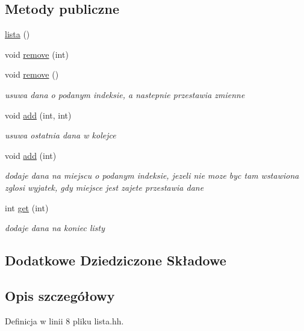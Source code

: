 \subsection*{Metody publiczne}
\begin{DoxyCompactItemize}
\item 
\hyperlink{classlista_a7ae1e1582d5b90e6bc26b8ecd2894072}{lista} ()
\item 
void \hyperlink{classlista_a567ac3ce85a3a7d7b10a3b0aafed56dd}{remove} (int)
\item 
void \hyperlink{classlista_af1900e0adeee6f2bf55c3b01c94b5e42}{remove} ()
\begin{DoxyCompactList}\small\item\em usuwa dana o podanym indeksie, a nastepnie przestawia zmienne \end{DoxyCompactList}\item 
void \hyperlink{classlista_abbc313e4d15605053e317b28246146bf}{add} (int, int)
\begin{DoxyCompactList}\small\item\em usuwa ostatnia dana w kolejce \end{DoxyCompactList}\item 
void \hyperlink{classlista_aa3b586da2830b20ca5818509a34ed6a6}{add} (int)
\begin{DoxyCompactList}\small\item\em dodaje dana na miejscu o podanym indeksie, jezeli nie moze byc tam wstawiona zglosi wyjatek, gdy miejsce jest zajete przestawia dane \end{DoxyCompactList}\item 
int \hyperlink{classlista_aca7a3313138e7033678c32b625fd5473}{get} (int)
\begin{DoxyCompactList}\small\item\em dodaje dana na koniec listy \end{DoxyCompactList}\end{DoxyCompactItemize}
\subsection*{Dodatkowe Dziedziczone Składowe}


\subsection{Opis szczegółowy}


Definicja w linii 8 pliku lista.\+hh.



